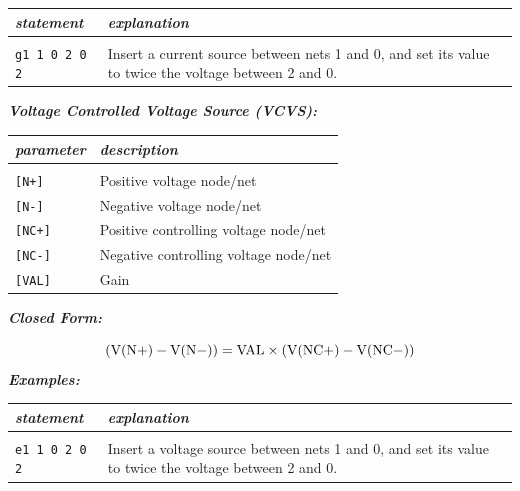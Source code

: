 \begin{longtable}{l l}
\textit{statement} & \textit{explanation} \\ \hline \\ \vspace{-0.8\parskip} 
\begin{minipage}{15em}\texttt{g1 1 0 2 0 2}\end{minipage}  
& 
\begin{minipage}{15em}{\small Insert a current source between nets 1 and 0, and set its value to twice the voltage between 2 and 0.}\end{minipage}  
\end{longtable}

\textbf{\textit{Voltage Controlled Voltage Source (VCVS):}}


\begin{longtable}{l l}
\textit{parameter} & \textit{description} \\ \hline \\ \vspace{-0.8\parskip}
\texttt{[N+]} & Positive voltage node/net \\
\texttt{[N-]} & Negative voltage node/net \\
\texttt{[NC+]} & Positive controlling voltage node/net \\
\texttt{[NC-]} & Negative controlling voltage node/net \\
\texttt{[VAL]} & Gain
\end{longtable}

\textbf{\textit{Closed Form:}}

  \[
    (\rm{V}(\rm{N+})-\rm{V}(\rm{N-}))= \rm{VAL}\times(\rm{V}(\rm{NC+})-\rm{V}(\rm{NC-}))\nonumber
  \]
\textbf{\textit{Examples:}}

\begin{longtable}{l l}
\textit{statement} & \textit{explanation} \\ \hline \\ \vspace{-0.8\parskip} 
\begin{minipage}{15em}\texttt{e1 1 0 2 0 2}\end{minipage}  
& 
\begin{minipage}{15em}{\small Insert a voltage source between nets 1 and 0, and set its value to twice the voltage between 2 and 0.}\end{minipage}  
\end{longtable}

